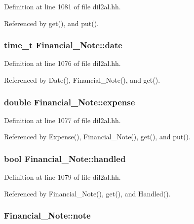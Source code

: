 Definition at line 1081 of file dil2al.hh.

Referenced by get(), and put().
\subsubsection{\setlength{\rightskip}{0pt plus 5cm}time\_\-t Financial\_\-Note::date\hspace{0.3cm}{\tt  [protected]}}\label{classFinancial__Note_n0}




Definition at line 1076 of file dil2al.hh.

Referenced by Date(), Financial\_\-Note(), and get().
\subsubsection{\setlength{\rightskip}{0pt plus 5cm}double Financial\_\-Note::expense\hspace{0.3cm}{\tt  [protected]}}\label{classFinancial__Note_n1}




Definition at line 1077 of file dil2al.hh.

Referenced by Expense(), Financial\_\-Note(), get(), and put().
\subsubsection{\setlength{\rightskip}{0pt plus 5cm}bool Financial\_\-Note::handled\hspace{0.3cm}{\tt  [protected]}}\label{classFinancial__Note_n3}




Definition at line 1079 of file dil2al.hh.

Referenced by Financial\_\-Note(), get(), and Handled().
\subsubsection{ Financial\_\-Note::note\hspace{0.3cm}{\tt  [protected]}}\label{classFinancial__Note_n4}




